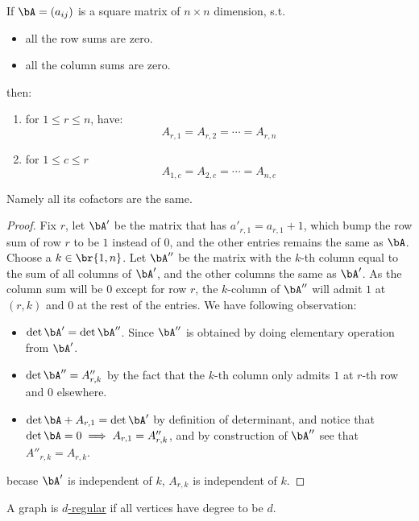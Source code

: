 \begin{lemma}
	\label{lem:cofactor-same}
	If \( \bA = (a_{ij}) \) is a square matrix of \( n\times n \) dimension, s.t.
	\begin{itemize}
		\item all the row sums are zero.
		\item all the column sums are zero.
	\end{itemize}
	then:
	\begin{enumerate}
		\item for \( 1\leq r \leq n \), have:
		      \[
			      A_{r,1} = A_{r,2} = \cdots = A_{r,n}
		      \]
		\item for \( 1\leq c\leq r \)
		      \[
			      A_{1,c} = A_{2,c} = \cdots = A_{n,c}
		      \]
	\end{enumerate}
	Namely all its cofactors are the same.
\end{lemma}
\begin{proof}
	Fix \( r \), let \( \bA' \) be the matrix that has \( a'_{r,1} = a_{r,1} + 1 \), which bump the row sum of row \( r \) to be \( 1 \) instead of \( 0 \), and the other entries remains the same as \( \bA \). Choose a \( k \in \br{1,n} \). Let \( \bA'' \) be the matrix with the \( k \)-th column equal to the sum of all columns of \( \bA' \), and the other columns the same as \( \bA' \). As the column sum will be \( 0 \) except for row \( r \), the $k$-column of \( \bA'' \) will admit \( 1 \) at \( (r,k) \) and \( 0 \) at the rest of the entries. We have following observation:
	\begin{itemize}
		\item \( \det \bA' = \det\bA'' \). Since \( \bA'' \) is obtained by doing elementary operation from \( \bA' \).
		\item \( \det \bA'' = A''_{r,k} \) by the fact that the \( k \)-th column only admits \( 1 \) at \( r \)-th row and \( 0 \) elsewhere.
		\item \( \det \bA + A_{r,1} = \det\bA' \) by definition of determinant, and notice that \( \det\bA = 0 \implies A_{r,1} = A''_{r,k}\), and by construction of \( \bA'' \) see that \( A''_{r,k} = A_{r,k} \).
	\end{itemize}
	becase \( \bA' \) is independent of \( k \), \( A_{r,k} \) is independent of \( k \).
\end{proof}

\begin{definition}
	A graph is \underline{\( d \)-regular} if all vertices have degree to be \( d \).
\end{definition}

